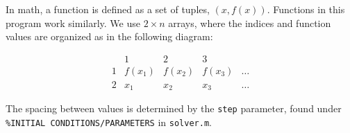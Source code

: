 \documentclass{article}
\def\code#1{\texttt{#1}}
\begin{document}
In math, a function is defined as a set of tuples, \((x, f(x))\). Functions in this program work similarly. We use \(2 \times n\) arrays, where the indices and function values are organized as in the following diagram: 

\begin{equation}
\begin{array}{c|c|c|c|c}
 & 1 & 2 & 3 \\
 \hline
 1 & f(x_1) & f(x_2) & f(x_3) & \hdots \\ 
  \hline
  2 & x_1 & x_2 & x_3 & \hdots
 \end{array}
 \end{equation}
 
 The spacing between values is determined by the \code{step} parameter, found under \code{\%INITIAL CONDITIONS/PARAMETERS} in \code{solver.m}. 
\end{document}
